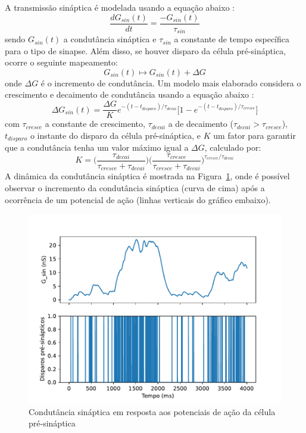 A transmissão sináptica é modelada usando a equação abaixo \cite{dayan_theoretical_2001}:
\begin{equation}\label{eq:sinapse}
	\frac{dG_{sin}(t)}{dt}=\frac{-G_{sin}(t)}{\tau_{sin}}
\end{equation}
sendo $G_{sin}(t)$ a condutância sináptica e $\tau_{sin}$ a constante de tempo específica para o tipo de sinapse. Além disso, se houver disparo da célula pré-sináptica, ocorre o seguinte mapeamento:
\begin{equation}\label{eq:sinapse_mapeamento}
	G_{sin}(t)\mapsto G_{sin}(t)+\Delta G
\end{equation}
onde $\Delta G$ é o incremento de condutância. Um modelo mais elaborado considera o crescimento e decaimento de condutância usando a equação abaixo \cite{miller_introductory_2018}:
\begin{equation}\label{eq:sinapse_delta}
	\Delta G_{sin}(t)=\frac{\Delta G}{K}e^{-(t-t_{disparo})/\tau_{decai}}\Big[1-e^{-(t-t_{disparo})/\tau_{cresce}}\Big]
\end{equation}
com $\tau_{cresce}$ a constante de crescimento, $\tau_{decai}$ a de decaimento ($\tau_{decai}>\tau_{cresce}$), $t_{disparo}$ o instante do disparo da célula pré-sináptica, e $K$ um fator para garantir que a condutância tenha um valor máximo igual a $\Delta G$, calculado por:
\begin{equation}\label{eq:sinapse_k}
	K=\Bigg(\frac{\tau_{decai}}{\tau_{cresce}+\tau_{decai}}\Bigg)\Bigg(\frac{\tau_{cresce}}{\tau_{cresce}+\tau_{decai}}\Bigg)^{\tau_{cresce}/\tau_{decai}}
\end{equation}
A dinâmica da condutância sináptica é mostrada na Figura~\ref{fig:respostasinaptica}, onde é possível observar o incremento da condutância sináptica (curva de cima) após a ocorrência de um potencial de ação (linhas verticais do gráfico embaixo).

\begin{figure}[tb]
	\centering
	\caption{Condutância sináptica em resposta aos potenciais de ação da célula pré-sináptica}
	\label{fig:respostasinaptica}
	\includegraphics[width=0.7\linewidth]{figs/resposta_sinaptica}
\end{figure}

